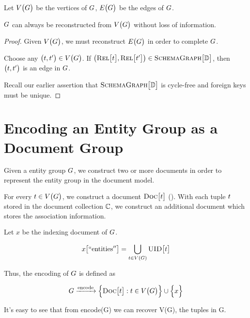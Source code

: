         Let $V\bigl(G\bigr)$ be the vertices of $G$, $E\bigl(G\bigr)$ be the edges of $G$.
        
        \begin{claim}
        \label{clm:lossless}
            $G$ can always be reconstructed from $V\bigl(G\bigr)$ without loss of information.
        \end{claim}
        
        \begin{proof}
            Given $V\bigl(G\bigr)$, we must reconstruct $E\bigl(G\bigr)$ in order to complete $G$.
            
            Choose any $\bigl(t, t'\bigr) \in V\bigl(G\bigr)$.  If $\bigl(\textsc{Rel}\bigl[t\bigr], \textsc{Rel}\bigl[t'\bigr]\bigr) \in \textsc{SchemaGraph}\bigl[\mathbb{D}\bigr]$, then $\bigl(t, t'\bigr)$ is an edge in $G$.
            
            Recall our earlier assertion that $\textsc{SchemaGraph}\bigl[\mathbb{D}\bigr]$ is cycle-free and foreign keys must be unique.
        \end{proof}
        
    \section{Encoding an Entity Group as a Document Group}
        Given a entity group $G$, we construct two or more documents in order to represent the entity group in the document model.
        
        For every $t \in V\bigl(G\bigr)$, we construct a document $\textsc{Doc}\bigl[t\bigr]$ ().  With each tuple $t$ stored in the document collection $\mathbb{C}$, we construct an additional document which stores the association information.
        
        Let $x$ be the indexing document of $G$.
        
        \[
            x\bigl[\mathrm{``entities''}\bigr] = \bigcup_{t \in V\left(G\right)} \textsc{UID}\bigl[t\bigr]
        \]
        
        Thus, the encoding of $G$ is defined as
        
        \[
            G \xrightarrow{\mathrm{encode}} \Bigl\{\textsc{Doc}\bigl[t\bigr] : t \in V\bigl(G\bigr)\Bigr\} \cup \Bigl\{x\Bigr\}
        \]
        
        It's easy to see that from encode(G) we can recover V(G), the tuples in G.
        
